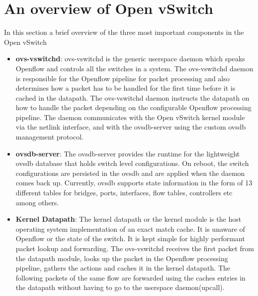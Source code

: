 \section{An overview of Open vSwitch}
In this section a brief overview of the three most important components in the Open vSwitch \cite{pfaff2015design}
\begin{itemize}
	\item \textbf{ovs-vswitchd}: ovs-vswitchd is the generic userspace daemon which speaks Openflow and controls all the switches in a system. The ovs-vswitchd daemon is responsible for the Openflow pipeline for packet processing and also determines how a packet has to be handled for the first time before it is cached in the datapath. The ovs-vswitchd daemon instructs the datapath on how to handle the packet depending on the configurable Openflow processing pipeline. The daemon communicates with the Open vSwitch kernel module via the netlink interface, and with the ovsdb-server using the custom ovsdb management protocol.
	\item \textbf{ovsdb-server}: The ovsdb-server provides the runtime for the lightweight ovsdb database that holds switch level configurations. On reboot, the switch configurations are persisted in the ovsdb and are applied when the  daemon comes back up. Currently, ovsdb supports state information in the form of 13 different tables for bridges, ports, interfaces, flow tables, controllers etc among others.
	\item \textbf{Kernel Datapath}: The kernel datapath or the kernel module is the host operating system implementation of an exact match cache. It is unaware of Openflow or the state of the switch. It is kept simple for highly performant packet lookup and forwarding. The ovs-vswitchd receives the first packet from the datapath module, looks up the packet in the Openflow processing pipeline, gathers the actions and caches it in the kernel datapath. The following packets of the same flow are forwarded using the caches entries in the datapath without having to go to the userspace daemon(upcall).
\end{itemize}


